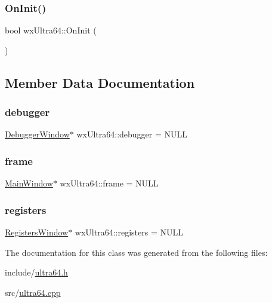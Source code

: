 \subsubsection{\texorpdfstring{On\+Init()}{OnInit()}}
{\footnotesize\ttfamily bool wx\+Ultra64\+::\+On\+Init (\begin{DoxyParamCaption}{ }\end{DoxyParamCaption})\hspace{0.3cm}{\ttfamily [virtual]}}



\subsection{Member Data Documentation}
\mbox{\label{classwx_ultra64_ae2a892a46d0d8b8c2ff29a1b2d32133b}} 
\subsubsection{\texorpdfstring{debugger}{debugger}}
{\footnotesize\ttfamily \hyperlink{class_debugger_window}{Debugger\+Window}$\ast$ wx\+Ultra64\+::debugger = N\+U\+LL}

\mbox{\label{classwx_ultra64_a46b06489d6a269c6be154cb0a7e1e4e9}} 
\subsubsection{\texorpdfstring{frame}{frame}}
{\footnotesize\ttfamily \hyperlink{class_main_window}{Main\+Window}$\ast$ wx\+Ultra64\+::frame = N\+U\+LL}

\mbox{\label{classwx_ultra64_aa287d484fb611c20ef6f3b2c422b5e2c}} 
\subsubsection{\texorpdfstring{registers}{registers}}
{\footnotesize\ttfamily \hyperlink{class_registers_window}{Registers\+Window}$\ast$ wx\+Ultra64\+::registers = N\+U\+LL}



The documentation for this class was generated from the following files\+:\begin{DoxyCompactItemize}
\item 
include/\hyperlink{ultra64_8h}{ultra64.\+h}\item 
src/\hyperlink{ultra64_8cpp}{ultra64.\+cpp}\end{DoxyCompactItemize}
